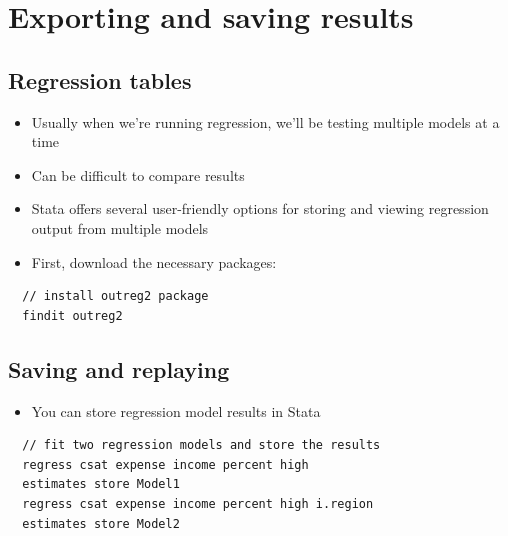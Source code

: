 \documentclass[]{book}
\providecommand{\tightlist}{%
  \setlength{\itemsep}{0pt}\setlength{\parskip}{0pt}}
\begin{document}
\section{Exporting and saving
results}\label{exporting-and-saving-results}

\subsection{Regression tables}\label{regression-tables}

\begin{itemize}
\tightlist
\item
  Usually when we're running regression, we'll be testing multiple
  models at a time
\item
  Can be difficult to compare results
\item
  Stata offers several user-friendly options for storing and viewing
  regression output from multiple models
\item
  First, download the necessary packages:
\end{itemize}

\begin{verbatim}
  // install outreg2 package
  findit outreg2
\end{verbatim}

\subsection{Saving and replaying}\label{saving-and-replaying}

\begin{itemize}
\tightlist
\item
  You can store regression model results in Stata
\end{itemize}

\begin{verbatim}
  // fit two regression models and store the results
  regress csat expense income percent high
  estimates store Model1
  regress csat expense income percent high i.region
  estimates store Model2
\end{verbatim}
\end{document}
